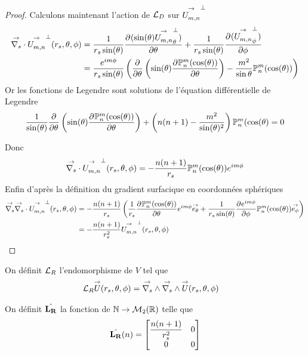 \begin{proof}
      Calculons maintenant l'action de \({\mathcal{L}_D}\) sur \({\overset{\rightarrow}{U_{m,n}^{{}}}}^\perp\)
      \begin{align*}
        {\overset{\rightarrow}{\nabla_s}} \cdot{}{\overset{\rightarrow}{U_{m,n}^{{}}}}^\perp(r_s,\theta,\phi) &= \dfrac{1}{r_s\sin(\theta)} \dfrac{\partial^{{}} (\sin(\theta){\overset{\rightarrow}{U_{m,n}^{{}}}}^\perp_\theta)}{{\partial \theta}^{{}}} + \dfrac{1}{r_s\sin(\theta)}\dfrac{\partial^{{}} ({\overset{\rightarrow}{U_{m,n}^{{}}}}^\perp_\phi)}{{\partial \phi}^{{}}}
        \\
        &= \dfrac{e^{im\phi}}{r_s\sin(\theta)}
        \left(
          \dfrac{\partial^{{}} }{{\partial \theta}^{{}}}\left(\sin(\theta)\dfrac{\partial^{{}} \mathbb{P}^m_n(\cos(\theta))}{{\partial \theta}^{{}}}\right) - \dfrac{m^2}{\sin\theta}\mathbb{P}^m_n(\cos(\theta))
        \right)
      \end{align*}
      Or les fonctions de Legendre sont solutions de l'équation différentielle de Legendre
      \begin{align*}
        \dfrac{1}{\sin(\theta)}\dfrac{\partial^{{}} }{{\partial \theta}^{{}}}\left(\sin(\theta)\dfrac{\partial^{{}} \mathbb{P}^m_n(\cos(\theta))}{{\partial \theta}^{{}}}\right) + \left(n(n+1)-\dfrac{m^2}{\sin(\theta)^2}\right)\mathbb{P}^m_n(\cos(\theta) = 0
      \end{align*}

      Donc 
      \begin{align*}
         {\overset{\rightarrow}{\nabla_s}} \cdot{}{\overset{\rightarrow}{U_{m,n}^{{}}}}^\perp(r_s,\theta,\phi) = -\dfrac{n(n+1)}{r_s}\mathbb{P}^m_n(\cos(\theta))e^{im\phi}
      \end{align*}
      Enfin d’après la définition du gradient surfacique en coordonnées sphériques
      \begin{align*}
         {\overset{\rightarrow}{\nabla_s}}{}{\overset{\rightarrow}{\nabla_s}} \cdot{}{\overset{\rightarrow}{U_{m,n}^{{}}}}^\perp(r_s,\theta,\phi) &= -\dfrac{n(n+1)}{r_s}\left(\dfrac{1}{r_s}\dfrac{\partial^{{}} \mathbb{P}^m_n(\cos(\theta))}{{\partial \theta}^{{}}}e^{im\phi}{\overset{\rightarrow}{e_\theta}}+\dfrac{1}{r_s\sin(\theta)}\dfrac{\partial^{{}} e^{im\phi}}{{\partial \phi}^{{}}}\mathbb{P}^m_n(\cos(\theta)){\overset{\rightarrow}{e_\phi}}\right)
         \\
         &=-\dfrac{n(n+1)}{r_s^2}{\overset{\rightarrow}{U_{m,n}^{{}}}}^\perp(r_s,\theta,\phi)
      \end{align*}
    \end{proof}


    \begin{defn}
      \label{eq:sphere:fourier:LR}
      On définit \({\mathcal{L}_R}\) l'endomorphisme de \(V\) tel que
      \begin{align*}
        {\mathcal{L}_R} {\overset{\rightarrow}{U}}(r_s,\theta,\phi) & = {\overset{\rightarrow}{\nabla_s}} \wedge{} {\overset{\rightarrow}{\nabla_s}} \wedge{} {\overset{\rightarrow}{U}}(r_s,\theta,\phi)
      \end{align*}

      On définit \(\hat{\mathbf{L_R}}\) la fonction de \(\mathbb N \rightarrow \mathcal{M}_2(\mathbb R)\) telle que
      \begin{equation*}
        \hat{\mathbf{L_R}}(n) =
        \begin{bmatrix}
          \dfrac{n(n+1)}{r_s^2} & 0
          \\
          0 & 0
        \end{bmatrix}
      \end{equation*}
    \end{defn}

